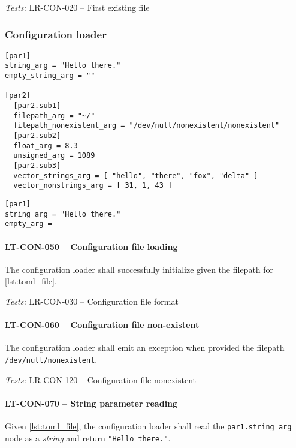 \textit{Tests: } LR-CON-020 -- First existing file

\subsubsection{Configuration loader}
\begin{minipage}{\linewidth}
  \begin{lstlisting}[caption={TOML test configuration file.},
                     label={lst:toml_file}]
[par1]
string_arg = "Hello there."
empty_string_arg = ""

[par2]
  [par2.sub1]
  filepath_arg = "~/"
  filepath_nonexistent_arg = "/dev/null/nonexistent/nonexistent"
  [par2.sub2]
  float_arg = 8.3
  unsigned_arg = 1089
  [par2.sub3]
  vector_strings_arg = [ "hello", "there", "fox", "delta" ]
  vector_nonstrings_arg = [ 31, 1, 43 ]
\end{lstlisting} \end{minipage}

\begin{minipage}{\linewidth}
  \begin{lstlisting}[caption={TOML test configuration file.},
                     label={lst:toml_file_empty}]
[par1]
string_arg = "Hello there."
empty_arg = 
\end{lstlisting} \end{minipage}

\paragraph{LT-CON-050 -- Configuration file loading}
The configuration loader shall successfully initialize given the filepath
for \cref{lst:toml_file}.

\textit{Tests: } LR-CON-030 -- Configuration file format

\paragraph{LT-CON-060 -- Configuration file non-existent}
The configuration loader shall emit an exception when provided the
filepath \lstinline{/dev/null/nonexistent}.

\textit{Tests: } LR-CON-120 -- Configuration file nonexistent

\paragraph{LT-CON-070 -- String parameter reading}
Given \cref{lst:toml_file}, the configuration loader shall read the
\lstinline{par1.string_arg} node as a \emph{string} and return
\lstinline{"Hello there."}.

